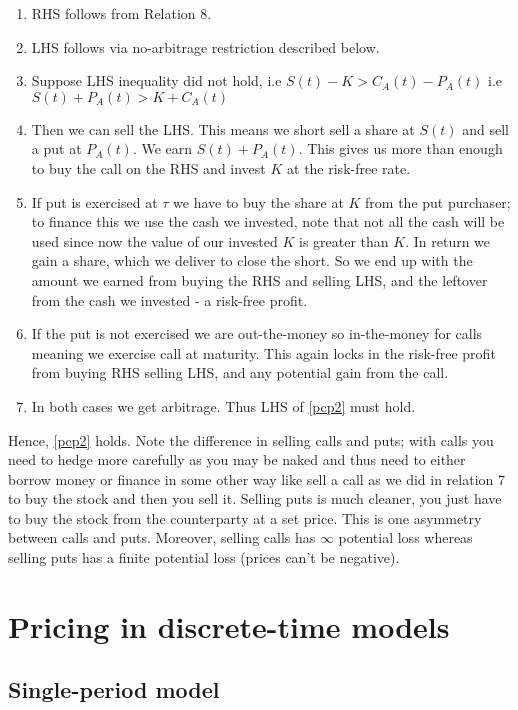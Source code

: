 \documentclass[9pt]{extarticle}
\begin{document}
\begin{enumerate}
  \item RHS follows from Relation 8. 
  \item LHS follows via no-arbitrage restriction described below.
  \item Suppose LHS inequality did not hold, i.e $S(t) - K > C_A(t) - P_A(t)$ i.e $S(t) + P_A(t) > K + C_A(t)$
  \item Then we can sell the LHS. This means we short sell a share 
  at $S(t)$ and sell a put at $P_A(t)$. We earn $S(t) + P_A(t)$. This gives us more than enough to buy the call on the RHS and invest 
  $K$ at the risk-free rate. 
  \item If put is exercised at $\tau$ we have to buy the share at $K$ from the put purchaser; to finance this we use the cash we invested, note that not all the cash will be used 
  since now the value of our invested $K$ is greater than $K$. In return we gain a share, which we deliver 
  to close the short. So we end up with the amount we earned from buying the RHS and selling LHS, and the leftover from the cash we invested - a risk-free profit.
  \item If the put is not exercised we are out-the-money so in-the-money for calls meaning we exercise call at maturity. This again locks in 
  the risk-free profit from buying RHS selling LHS, and any potential gain from the call.
  \item In both cases we get arbitrage. Thus LHS of \eqref{pcp2} must hold. 
\end{enumerate}
Hence, \eqref{pcp2} holds. Note the difference in selling calls and puts; with calls you need to hedge more carefully as you may be naked and thus need to either borrow money 
or finance in some other way like sell a call as we did in relation 7 to buy the stock and then you sell it. Selling puts is much cleaner, you just have to buy the stock from 
the counterparty at a set price. This is one asymmetry between calls and puts. Moreover, selling calls has $\infty$ potential loss whereas selling puts has a finite 
potential loss (prices can't be negative).

\newpage
\section{Pricing in discrete-time models}

\subsection{Single-period model}
\end{document}
